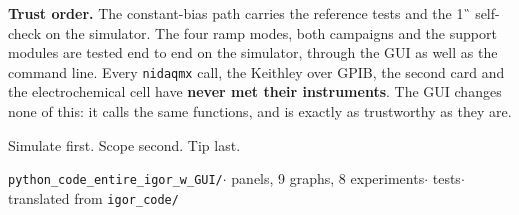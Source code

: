 \begin{titlepage}
\vfill
\begin{warnbox}\small
\textbf{Trust order.} The constant-bias path carries the reference tests and
the 1~\G{} self-check on the simulator. The four ramp modes, both campaigns
and the support modules are tested end to end on the simulator, through the
GUI as well as the command line. Every \texttt{nidaqmx} call, the Keithley
over GPIB, the second card and the electrochemical cell have \textbf{never
met their instruments}. The GUI changes none of this: it calls the same
functions, and is exactly as trustworthy as they are.

Simulate first. Scope second. Tip last.
\end{warnbox}

\vspace{4mm}
{\small \texttt{python\_code\_entire\_igor\_w\_GUI/}\quad$\cdot$ panels, 9 graphs, 8 experiments\quad$\cdot$ tests\quad$\cdot$\quad
translated from \texttt{igor\_code/}}
\end{titlepage}

\tableofcontents
